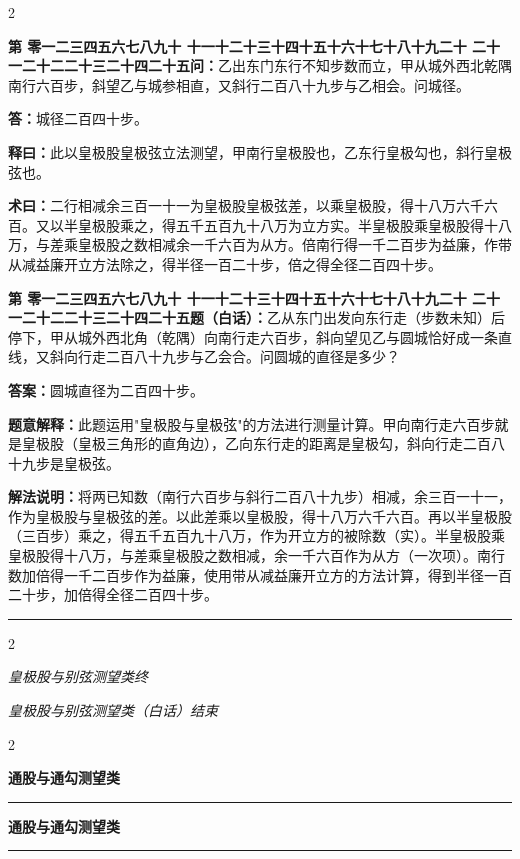 \documentclass[10pt,a4paper]{article}
\newcommand{\longline}{\noindent\rule{\textwidth}{0.4pt}}
\newcounter{probnum}
\newcounter{probnumvol}[section]
\newcommand{\chnum}[1]{%
  \ifcase#1 零\or 一\or 二\or 三\or 四\or 五\or 六\or 七\or 八\or 九\or 十\or
    十一\or 十二\or 十三\or 十四\or 十五\or 十六\or 十七\or 十八\or 十九\or 二十\or
    二十一\or 二十二\or 二十三\or 二十四\or 二十五\fi}
\newcommand{\problemclassical}[1]{%
  \stepcounter{probnumvol}%
  \par\noindent
  \textcolor{classicalcolor}{\textbf{第\chnum{\value{probnumvol}}问：}}#1\par\smallskip
}
\newcommand{\problemmodern}[1]{%
  \par\noindent
  \textcolor{moderncolor}{\textbf{第\chnum{\value{probnumvol}}题（白话）：}}#1\par\smallskip
}
\newcommand{\answerclassical}[1]{%
  \par\noindent\textcolor{classicalcolor}{\textbf{答：}}#1\par
}
\newcommand{\answermodern}[1]{%
  \par\noindent\textcolor{moderncolor}{\textbf{答案：}}#1\par
}
\newcommand{\shiyiclassical}[1]{%
  \par\noindent\textcolor{classicalcolor}{\textbf{释曰：}}#1\par
}
\newcommand{\shiyimodern}[1]{%
  \par\noindent\textcolor{moderncolor}{\textbf{题意解释：}}#1\par
}
\newcommand{\shuyueclassical}[1]{%
  \par\noindent\textcolor{classicalcolor}{\textbf{术曰：}}#1\par
}
\newcommand{\shuyuemodern}[1]{%
  \par\noindent\textcolor{moderncolor}{\textbf{解法说明：}}#1\par
}
\newcommand{\volheaderclassical}[1]{%
  \begin{center}{\large\bfseries\color{volcolor} #1}\end{center}
  \vspace{0.3cm}
  \longline
  \vspace{0.3cm}
}
\newcommand{\volheadermodern}[1]{%
  \begin{center}{\large\bfseries\color{volcolor} #1}\end{center}
  \vspace{0.3cm}
  \longline
  \vspace{0.3cm}
}
\newcommand{\endclassical}[1]{%
  \vspace{0.3cm}
  \begin{center}\textit{#1}\end{center}
}
\newcommand{\endmodern}[1]{%
  \vspace{0.3cm}
  \begin{center}\textit{#1}\end{center}
}
\begin{document}
\begin{paracol}{2}

\problemclassical{乙出东门东行不知步数而立，甲从城外西北乾隅南行六百步，斜望乙与城参相直，又斜行二百八十九步与乙相会。问城径。}

\answerclassical{城径二百四十步。}

\shiyiclassical{此以皇极股皇极弦立法测望，甲南行皇极股也，乙东行皇极勾也，斜行皇极弦也。}

\shuyueclassical{二行相减余三百一十一为皇极股皇极弦差，以乘皇极股，得十八万六千六百。又以半皇极股乘之，得五千五百九十八万为立方实。半皇极股乘皇极股得十八万，与差乘皇极股之数相减余一千六百为从方。倍南行得一千二百步为益廉，作带从减益廉开立方法除之，得半径一百二十步，倍之得全径二百四十步。}

\switchcolumn

\problemmodern{乙从东门出发向东行走（步数未知）后停下，甲从城外西北角（乾隅）向南行走六百步，斜向望见乙与圆城恰好成一条直线，又斜向行走二百八十九步与乙会合。问圆城的直径是多少？}

\answermodern{圆城直径为二百四十步。}

\shiyimodern{此题运用"皇极股与皇极弦"的方法进行测量计算。甲向南行走六百步就是皇极股（皇极三角形的直角边），乙向东行走的距离是皇极勾，斜向行走二百八十九步是皇极弦。}

\shuyuemodern{将两已知数（南行六百步与斜行二百八十九步）相减，余三百一十一，作为皇极股与皇极弦的差。以此差乘以皇极股，得十八万六千六百。再以半皇极股（三百步）乘之，得五千五百九十八万，作为开立方的被除数（实）。半皇极股乘皇极股得十八万，与差乘皇极股之数相减，余一千六百作为从方（一次项）。南行数加倍得一千二百步作为益廉，使用带从减益廉开立方的方法计算，得到半径一百二十步，加倍得全径二百四十步。}

\end{paracol}

\vspace{0.5cm}
\longline
\begin{paracol}{2}
\endclassical{皇极股与别弦测望类终}
\switchcolumn
\endmodern{皇极股与别弦测望类（白话）结束}
\end{paracol}

\newpage

\setcounter{probnumvol}{0}

\begin{paracol}{2}

\volheaderclassical{通股与通勾测望类}

\switchcolumn

\volheadermodern{通股与通勾测望类}

\end{paracol}
\end{document}
